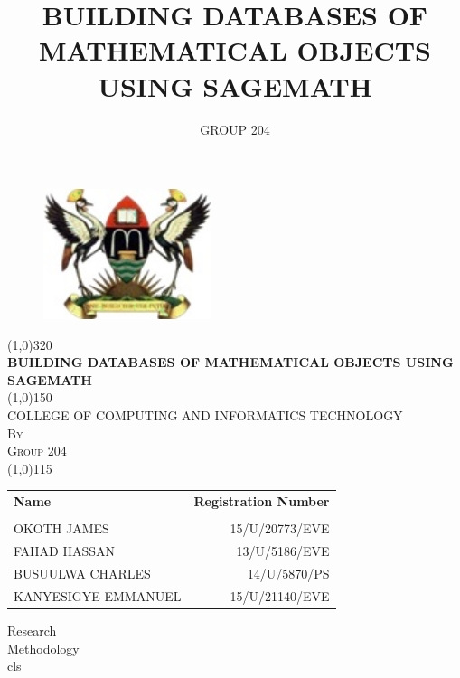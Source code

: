\documentclass[11pt]{article} %
\title{BUILDING DATABASES OF MATHEMATICAL OBJECTS USING SAGEMATH}
\author{GROUP 204}
\begin{document}
\begin{titlepage}
	\begin{figure}
		\centering
		\includegraphics[height=1.5in]{muk.jpg}
	\end{figure}
	\begin{center}
		\line(1,0){320}\\
		[0.25in]
		\huge{\bfseries BUILDING DATABASES OF MATHEMATICAL OBJECTS USING SAGEMATH}\\
		[2mm]
		\line(1,0){150}\\
		[1.2cm]
		\textsc{\large COLLEGE OF COMPUTING AND INFORMATICS TECHNOLOGY}\\
		[0.5cm]
		\textsc{\large By}\\
		[0.5cm]
		\textsc{\large Group 204}\\
		[0.2cm]
		\line(1,0){115}\\
		[0.2in]
	\end{center}

\begin{table}[H]
	\centering
	\label{Tab:GroupMembers}
	\begin{tabular}{lr}
		\bfseries{Name} & \bfseries{Registration Number} \\ \\ 
		OKOTH JAMES         & 15/U/20773/EVE \\
		FAHAD HASSAN        & 13/U/5186/EVE \\
		BUSUULWA CHARLES    & 14/U/5870/PS \\   
		KANYESIGYE EMMANUEL & 15/U/21140/EVE \\
	\end{tabular}
\end{table}
	\begin{flushright}
		Research\\
		Methodology\\
		cls\\
	\end{flushright}
\end{titlepage}
\thispagestyle{empty}

\end{document}
